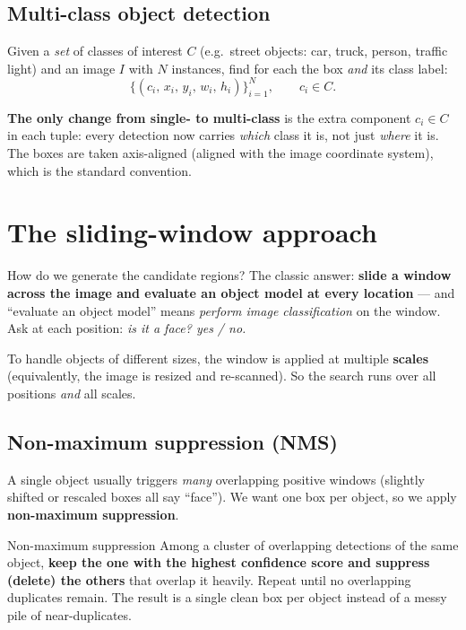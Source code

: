 \documentclass{report}
\begin{document}
\subsection{Multi-class object detection}

Given a \emph{set} of classes of interest $C$ (e.g.\ street objects: car,
truck, person, traffic light) and an image $I$ with $N$ instances, find for each
the box \emph{and} its class label:
\[
\{(c_i,\,x_i,\,y_i,\,w_i,\,h_i)\}_{i=1}^{N},
\qquad c_i \in C .
\]

\begin{keybox}
\textbf{The only change from single- to multi-class} is the extra component
$c_i \in C$ in each tuple: every detection now carries \emph{which} class it is,
not just \emph{where} it is. The boxes are taken axis-aligned (aligned with the
image coordinate system), which is the standard convention.
\end{keybox}

\section{The sliding-window approach}

How do we generate the candidate regions? The classic answer: \textbf{slide a
window across the image and evaluate an object model at every location} --- and
``evaluate an object model'' means \emph{perform image classification} on the
window. Ask at each position: \emph{is it a face? yes / no.}

To handle objects of different sizes, the window is applied at multiple
\textbf{scales} (equivalently, the image is resized and re-scanned). So the
search runs over all positions \emph{and} all scales.

\subsection{Non-maximum suppression (NMS)}

A single object usually triggers \emph{many} overlapping positive windows
(slightly shifted or rescaled boxes all say ``face''). We want one box per
object, so we apply \textbf{non-maximum suppression}.

\begin{defbox}{Non-maximum suppression}
Among a cluster of overlapping detections of the same object, \textbf{keep the
one with the highest confidence score and suppress (delete) the others} that
overlap it heavily. Repeat until no overlapping duplicates remain. The result
is a single clean box per object instead of a messy pile of near-duplicates.
\end{defbox}
\end{document}

